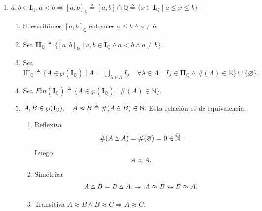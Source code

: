   \begin{enumerate}
  \def\labelenumii{\arabic{enumii}.}
  \setcounter{enumii}{1}
  \item
    $a, b \in \mathbf{I}_{\mathbb{Q}}, a < b \Rightarrow [a,b]_{\mathbb{Q}} \triangleq [a,b] \cap \mathbb{Q} \triangleq \{ x \in \mathbf{I}_{\mathbb{Q}} \mid a \leq x \leq b \}$

    \begin{enumerate}
    \def\labelenumiii{\arabic{enumiii}.}
    \item
      Si escribimos $[a,b]_{\mathbb{Q}}$
      entonces $a \leq b \land a \neq b.$
    \item
      Sea
      $\mathbf{II}_{\mathbb{Q}} \triangleq \{ [a,b]_{\mathbb{Q}} \mid a, b \in \mathbf{I}_{\mathbb{Q}} \land a < b \land a \neq b \}.$
    \item
      Sea
      $\mathbf{\mathrm{III}}_{\mathbb{Q}} \triangleq \{ A \in \wp( \mathbf{I}_{\mathbb{Q}} ) \mid A = \bigcup_{\lambda \in \Lambda} I_{\lambda} \quad \forall \lambda \in \Lambda \quad I_{\lambda} \in \mathbf{II}_{\mathbb{Q}} \land \#(\Lambda) \in \mathbb{N} \} \cup \{ \varnothing \}.$
    \item
      Sea
      $\mathit{Fin}( \mathbf{I}_{\mathbb{Q}} ) \triangleq \{ A \in \wp( \mathbf{I}_{\mathbb{Q}} ) \mid \#(A) \in \mathbb{N} \}.$
    \item
      $A, B \in \wp( \mathbf{I}_{\mathbb{Q}} ), \quad A \approx B \triangleq \#( A \mathbin{\vartriangle} B ) \in \mathbb{N}.$
      Esta relación es de equivalencia.

      \begin{enumerate}
      \def\labelenumiv{\arabic{enumiv}.}
      \item
        Reflexiva
        \[\#{\left( {A \mathbin{\vartriangle} A} \right) = \#}{{(\varnothing) = 0} \in \widetilde{\mathbb{N}}} . \]
        Luego \[A \approx A . \]
      \item
        Simétrica
        \[A \mathbin{\vartriangle} {B = B} \mathbin{\vartriangle} A.\Rightarrow.A \approx B\Leftrightarrow B \approx A . \]
      \item
        Transitiva
        $A \approx B \land B \approx C \Rightarrow A \approx C.$


\end{enumerate}
\end{enumerate}
\end{enumerate}
